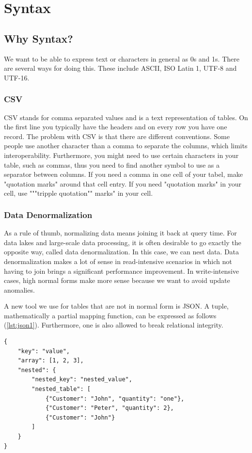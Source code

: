 \section{Syntax}

\subsection{Why Syntax?}

We want to be able to express text or characters in general as 0s and 1s. There are several ways for doing this. These include ASCII, ISO Latin 1, UTF-8 and UTF-16.

\subsubsection{CSV}
CSV stands for comma separated values and is a text representation of tables. On the first line you typically have the headers and on every row you have one record. The problem with CSV is that there are different conventions. Some people use another character than a comma to separate the columns, which limits interoperability. Furthermore, you might need to use certain characters in your table, such as commas, thus you need to find another symbol to use as a separator between columns. If you need a comma in one cell of your tabel, make "quotation marks" around that cell entry. If you need "quotation marks" in your cell, use """tripple quotation"" marks" in your cell.

\subsubsection{Data Denormalization}
As a rule of thumb, normalizing data means joining it back at query time. For data lakes and large-scale data processing, it is often desirable to go exactly the opposite way, called data denormalization. In this case, we can nest data. Data denormalization makes a lot of sense in read-intensive scenarios in which not having to join brings a significant performance improvement. In write-intensive cases, high normal forms make more sense because we want to avoid update anomalies.

A new tool we use for tables that are not in normal form is JSON. A tuple, mathematically a partial mapping function, can be expressed as follows (\cref{lst:json1}). Furthermore, one is also allowed to break relational integrity.

\begin{lstlisting}[style=json, caption={Example JSON code}, label={lst:json1}]
{
    "key": "value",
    "array": [1, 2, 3],
    "nested": {
        "nested_key": "nested_value",
        "nested_table": [
            {"Customer": "John", "quantity": "one"},
            {"Customer": "Peter", "quantity": 2},
            {"Customer": "John"}
        ]
    }
}
\end{lstlisting}

